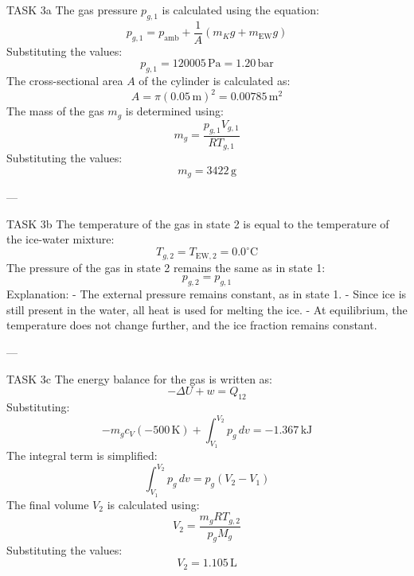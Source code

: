 TASK 3a  
The gas pressure \( p_{g,1} \) is calculated using the equation:  
\[
p_{g,1} = p_{\text{amb}} + \frac{1}{A}(m_K g + m_{\text{EW}} g)
\]  
Substituting the values:  
\[
p_{g,1} = 120005 \, \text{Pa} = 1.20 \, \text{bar}
\]  
The cross-sectional area \( A \) of the cylinder is calculated as:  
\[
A = \pi (0.05 \, \text{m})^2 = 0.00785 \, \text{m}^2
\]  
The mass of the gas \( m_g \) is determined using:  
\[
m_g = \frac{p_{g,1} V_{g,1}}{R T_{g,1}}
\]  
Substituting the values:  
\[
m_g = 3422 \, \text{g}
\]  

---

TASK 3b  
The temperature of the gas in state 2 is equal to the temperature of the ice-water mixture:  
\[
T_{g,2} = T_{\text{EW},2} = 0.0^\circ\text{C}
\]  
The pressure of the gas in state 2 remains the same as in state 1:  
\[
p_{g,2} = p_{g,1}
\]  
Explanation:  
- The external pressure remains constant, as in state 1.  
- Since ice is still present in the water, all heat is used for melting the ice.  
- At equilibrium, the temperature does not change further, and the ice fraction remains constant.  

---

TASK 3c  
The energy balance for the gas is written as:  
\[
-\Delta U + w = Q_{12}
\]  
Substituting:  
\[
-m_g c_V (-500 \, \text{K}) + \int_{V_1}^{V_2} p_g \, dv = -1.367 \, \text{kJ}
\]  
The integral term is simplified:  
\[
\int_{V_1}^{V_2} p_g \, dv = p_g (V_2 - V_1)
\]  
The final volume \( V_2 \) is calculated using:  
\[
V_2 = \frac{m_g R T_{g,2}}{p_g M_g}
\]  
Substituting the values:  
\[
V_2 = 1.105 \, \text{L}
\]